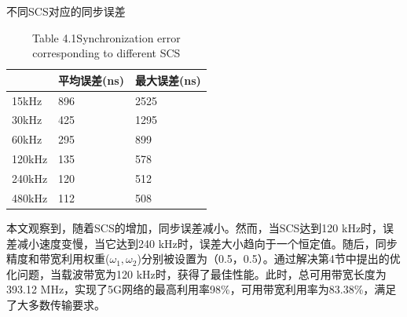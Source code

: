 \documentclass[UTF8,a4paper,12pt]{ctexart}
\numberwithin{equation}{section}
\begin{document}
	\begin{table}[!htb]
		\centering
		\caption{不同SCS对应的同步误差}
		\vspace{-10pt}
		\caption*{Table 4.1\quad Synchronization error corresponding to different SCS}
		\label{tab1}
		\begin{tabular}{l|l|l}
			\hline
			& \textbf{平均误差(ns)}& \textbf{最大误差(ns)} \\
			\hline
			15kHz 
			& 896
			& 2525 \\
			\hline
			30kHz
			& 425
			& 1295 \\
			\hline
			60kHz
			& 295
			& 899 \\
			\hline
			120kHz
			& 135
			& 578 \\
			\hline
			240kHz
			& 120
			& 512 \\
			\hline
			480kHz
			& 112
			& 508 \\
			\hline
		\end{tabular}
	\end{table}
	
	
	本文观察到，随着SCS的增加，同步误差减小。然而，当SCS达到120 kHz时，误差减小速度变慢，当它达到240 kHz时，误差大小趋向于一个恒定值。随后，同步精度和带宽利用权重($\omega_1,\omega_2$)分别被设置为（0.5，0.5）。通过解决第4节中提出的优化问题，当载波带宽为120 kHz时，获得了最佳性能。此时，总可用带宽长度为393.12 MHz，实现了5G网络的最高利用率98\%，可用带宽利用率为83.38\%，满足了大多数传输要求。
	
\end{document}
